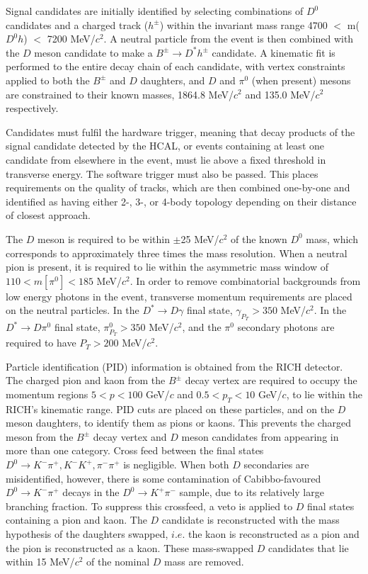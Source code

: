 \documentclass[oneside,12pt]{article}
\begin{document}
Signal candidates are initially identified by selecting combinations of $D^0$
candidates and a charged track ($h^{\pm}$) within the invariant mass range 4700
$<$ m($D^0h$) $<$ 7200 MeV/$c^2$. A neutral particle from the event is then
combined with the $D$ meson candidate to make a $B^{\pm}\rightarrow D^*h^{\pm}$
candidate. A kinematic fit is performed to the entire decay chain of each
candidate, with vertex constraints applied to both the $B^{\pm}$ and $D$
daughters, and $D$ and $\pi^0$ (when present) mesons are constrained to their
known masses, 1864.8 MeV/$c^2$ and 135.0 MeV/$c^2$ respectively.

Candidates must fulfil the hardware trigger, meaning that decay products of the
signal candidate detected by the HCAL, or events containing at least one
candidate from elsewhere in the event, must lie above a fixed threshold in
transverse energy.  The software trigger must also be passed. This places
requirements on the quality of tracks, which are then combined one-by-one and
identified as having either 2-, 3-, or 4-body topology depending on their
distance of closest approach. 

The $D$ meson is required to be within $\pm$25 MeV/$c^2$ of the known $D^0$
mass, which corresponds to approximately three times the mass resolution.  When
a neutral pion is present, it is required to lie within the asymmetric mass
window of $110 < m[\pi^0] < 185$ MeV/$c^2$. In order to remove combinatorial
backgrounds from low energy photons in the event, transverse momentum
requirements are placed on the neutral particles. In the $D^*\rightarrow
D\gamma$ final state, $\gamma_{P_T}>350$ MeV/$c^2$. In the $D^*\rightarrow
D\pi^0$ final state, $\pi^0_{P_T}>350$ MeV/$c^2$, and the $\pi^0$ secondary
photons are required to have $P_T>200$ MeV/$c^2$.

Particle identification (PID) information is obtained from the RICH detector.
The charged pion and kaon from the $B^{\pm}$ decay vertex are required to occupy
the momentum regions $5 < p < 100$ GeV/$c$ and $0.5 < p_T < 10$ GeV/$c$, to lie
within the RICH's kinematic range. PID cuts are placed on these particles, and
on the $D$ meson daughters, to identify them as pions or kaons. This prevents
the charged meson from the $B^{\pm}$ decay vertex and $D$ meson candidates from
appearing in more than one category. Cross feed between the final states
$D^{0}\rightarrow K^-\pi^+, K^-K^+, \pi^-\pi^+$ is negligible. When both $D$
secondaries are misidentified, however, there is some contamination of
Cabibbo-favoured $D^0\rightarrow K^-\pi^+$ decays in the $D^0\rightarrow
K^+\pi^-$ sample, due to its relatively large branching fraction. To suppress
this crossfeed, a veto is applied to $D$ final states containing a pion and
kaon.  The $D$ candidate is reconstructed with the mass hypothesis of the
daughters swapped, $i.e.$ the kaon is reconstructed as a pion and the pion is
reconstructed as a kaon. These mass-swapped $D$ candidates that lie within 15
MeV/$c^2$ of the nominal $D$ mass are removed. 
\end{document}

